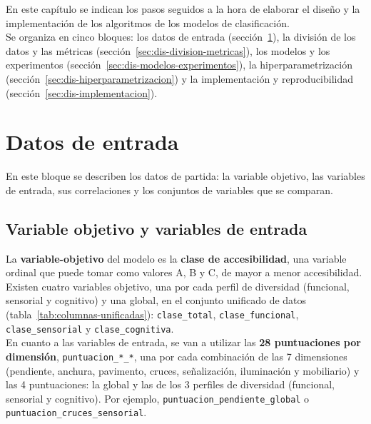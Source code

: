 \label{cap:diseno-implementacion}

En este capítulo se indican los pasos seguidos a la hora de elaborar el diseño y la implementación de los algoritmos de los modelos de clasificación.
\\

Se organiza en cinco bloques: los datos de entrada (sección~\ref{sec:dis-datos}), la división de los datos y las métricas (sección~\ref{sec:dis-division-metricas}), los modelos y los experimentos (sección~\ref{sec:dis-modelos-experimentos}), la hiperparametrización (sección~\ref{sec:dis-hiperparametrizacion}) y la implementación y reproducibilidad (sección~\ref{sec:dis-implementacion}).
\\

\section{Datos de entrada}
\label{sec:dis-datos}

En este bloque se describen los datos de partida: la variable objetivo, las variables de entrada, sus correlaciones y los conjuntos de variables que se comparan.
\\

\subsection{Variable objetivo y variables de entrada}
\label{subsec:dis-variables}

La \textbf{\gls{variable-objetivo}} del modelo es la \textbf{clase de accesibilidad}, una variable ordinal que puede tomar como valores A, B y C, de mayor a menor accesibilidad.
\\

Existen cuatro variables objetivo, una por cada perfil de diversidad (funcional, sensorial y cognitivo) y una global, en el conjunto unificado de datos (tabla~\ref{tab:columnas-unificadas}): \texttt{clase\_total}, \texttt{clase\_funcional}, \texttt{clase\_sensorial} y \texttt{clase\_cognitiva}.
\\

En cuanto a las variables de entrada, se van a utilizar las \textbf{28 puntuaciones por dimensión}, \texttt{puntuacion\_*\_*}, una por cada combinación de las 7 dimensiones (pendiente, anchura, pavimento, cruces, señalización, iluminación y mobiliario) y las 4 puntuaciones: la global y las de los 3 perfiles de diversidad (funcional, sensorial y cognitivo). Por ejemplo, \texttt{puntuacion\_pendiente\_global} o \texttt{puntuacion\_cruces\_sensorial}.
\\

